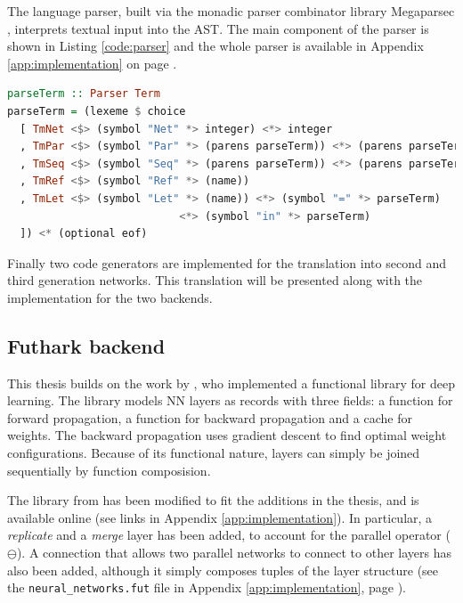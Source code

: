 The language parser, built via the monadic parser combinator library Megaparsec
\cite{megaparsec}, interprets textual input into the AST. 
The main component of the parser is shown in Listing \ref{code:parser}
and the whole parser is available in Appendix \ref{app:implementation} on page
\pageref{app:implementation_parser}.

\begin{lstlisting}[language=Haskell,name=The main component of the text parser
for Volr.,label={code:parser}]
parseTerm :: Parser Term
parseTerm = (lexeme $ choice
  [ TmNet <$> (symbol "Net" *> integer) <*> integer
  , TmPar <$> (symbol "Par" *> (parens parseTerm)) <*> (parens parseTerm)
  , TmSeq <$> (symbol "Seq" *> (parens parseTerm)) <*> (parens parseTerm)
  , TmRef <$> (symbol "Ref" *> (name))
  , TmLet <$> (symbol "Let" *> (name)) <*> (symbol "=" *> parseTerm)
                           <*> (symbol "in" *> parseTerm)
  ]) <* (optional eof)
\end{lstlisting}

Finally two code generators are implemented for the translation into
second and third generation networks.
This translation will be presented along with the implementation
for the two backends.

\subsection{Futhark backend} \label{sec:volr-futhark}
This thesis builds on the work by \textcite{Minh2018}, who 
implemented a functional library for deep learning.
The library models \gls{NN} layers as records with three fields:
a function for forward propagation, a function for backward propagation
and a cache for weights. 
The backward propagation uses gradient descent to find optimal
weight configurations.
Because of its functional nature, layers can simply be joined 
sequentially by function composision.

The library from \cite{Minh2018} has been modified to fit the
additions in the thesis, and is available online (see links in 
Appendix \ref{app:implementation}).
In particular, a \textit{replicate} and a \textit{merge} layer has
been added, to account for the parallel operator ($\ominus$).
A connection that allows two parallel networks to connect to other
layers has also been added, although it simply composes tuples of
the layer structure (see the \texttt{neural\_networks.fut} file in
Appendix \ref{app:implementation}, page \pageref{app:implementation_fut_nn}).

